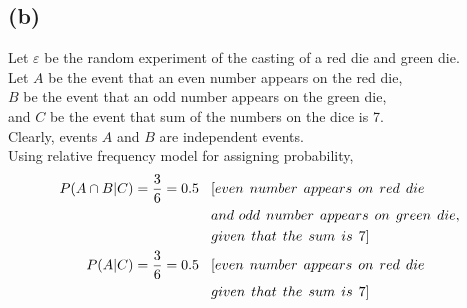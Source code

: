 \documentclass[a4paper,fleqn,11pt]{article}
\theoremstyle{mytheor}
\begin{document}
\subsection*{(b)}
Let $\varepsilon$ be the random experiment of the casting of a red die and green die. \\
Let $A$ be the event that an even number appears on the red die, \\
$B$ be the event that an odd number appears on the green die, \\
and $C$ be the event that sum of the numbers on the dice is 7. \\
Clearly, events $A$ and $B$ are independent events. \\
Using relative frequency model for assigning probability,
\begin{align*}
P (A \cap B | C) = \frac{3}{6} = 0.5 \hspace{2ex} & [even \hspace{1ex} number \hspace{1ex}appears \hspace{1ex} on \hspace{1ex} red \hspace{1ex} die \\
& and\ odd \hspace{1ex} number \hspace{1ex} appears \hspace{1ex} on \hspace{1ex} green \hspace{1ex} die, \\
& given \hspace{1ex} that \hspace{1ex} the \hspace{1ex} sum \hspace{1ex} is \hspace{1ex} 7]\\
P (A | C) = \frac{3}{6} = 0.5 \hspace{2ex} & [even \hspace{1ex} number \hspace{1ex}appears \hspace{1ex} on \hspace{1ex} red \hspace{1ex} die \\
& given \hspace{1ex} that \hspace{1ex} the \hspace{1ex} sum \hspace{1ex} is \hspace{1ex} 7]\\

\end{align*}
\end{document}
